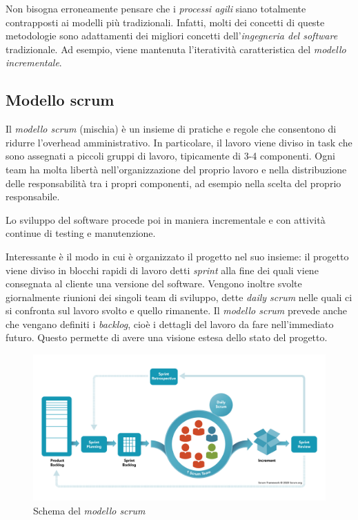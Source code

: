 \documentclass[12pt, a4paper]{report}
\theoremstyle{def}
\theoremstyle{definition}
\begin{document}
Non bisogna erroneamente pensare che i \emph{processi agili} siano totalmente
contrapposti ai modelli più tradizionali. Infatti, molti dei concetti di queste
metodologie sono adattamenti dei migliori concetti dell'\emph{ingegneria del
software} tradizionale. Ad esempio, viene mantenuta l'iteratività caratteristica
del \emph{modello incrementale}.

\subsection{Modello scrum}
Il \emph{modello scrum} (mischia) è un insieme di pratiche e regole che consentono
di ridurre l'overhead amministrativo. In particolare, il lavoro viene diviso in
task che sono assegnati a piccoli gruppi di lavoro, tipicamente di 3-4 componenti.
Ogni team ha molta libertà nell'organizzazione del proprio lavoro e nella
distribuzione delle responsabilità tra i propri componenti, ad esempio nella
scelta del proprio responsabile.

Lo sviluppo del software procede poi in maniera incrementale e con attività
continue di testing e manutenzione.

Interessante è il modo in cui è organizzato il progetto nel suo insieme: il
progetto viene diviso in blocchi rapidi di lavoro detti \emph{sprint} alla fine
dei quali viene consegnata al cliente una versione del software. Vengono inoltre
svolte giornalmente riunioni dei singoli team di sviluppo, dette \emph{daily scrum}
nelle quali ci si confronta sul lavoro svolto e quello rimanente. Il \emph{modello
scrum} prevede anche che vengano definiti i \emph{backlog}, cioè i dettagli del
lavoro da fare nell'immediato futuro. Questo permette di avere una visione estesa
dello stato del progetto.

\begin{figure}[t]
    \centering
    \includegraphics[width=\textwidth]{modello-scrum.png}
    \caption{Schema del \emph{modello scrum}}
\end{figure}
\end{document}
